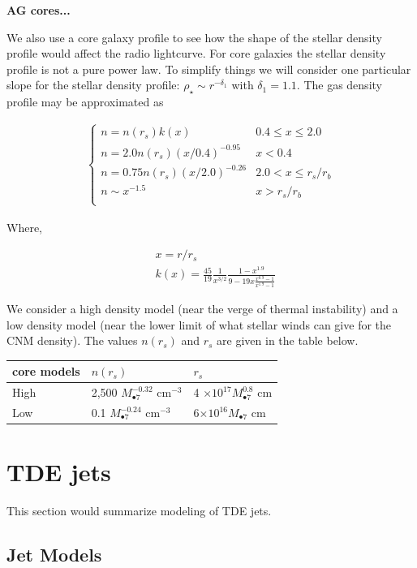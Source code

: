 \documentclass[usenatbib,fleqn]{mn2e}
\newcommand{\Mbh}[1][]{M_{\bullet#1}}
\begin{document}
{\bf AG cores...}

We also use a core galaxy profile to see how the shape of the stellar
density profile would affect the radio lightcurve. For core galaxies
the stellar density profile is not a pure power law. To simplify
things we will consider one particular slope for the stellar density
profile: $\rho_\star\sim r^{-\delta_1}$ with $\delta_1=1.1$. The gas
density profile may be approximated as

\begin{align}
\begin{cases}
n=n(r_s) k(x) & 0.4 \leq x\leq 2.0\\
n = 2.0 n(r_s) (x/0.4)^{-0.95} & x < 0.4\\
n = 0.75 n(r_s) (x/2.0)^{-0.26} & 2.0< x \leq r_s/r_b\\
n \sim x^{-1.5} & x>r_s/r_b\\
\end{cases}
\end{align}

Where, 

\begin{align}
  &x=r/r_s\\\nonumber
  &k(x)=\frac{45}{19} \frac{1}{x^{3/2}} \frac{1-x^{1.9}}{9-19
      x\frac{x^{0.9}-1}{x^{1.9}-1}}
\end{align}

We consider a high density model (near the verge of thermal
instability) and a low density model (near the lower limit of what
stellar winds can give for the CNM density). The values $n(r_s)$ and
$r_s$ are given in the table below. 

\begin{table}
\begin{tabular}{|l|l|l}
 core models & $n(r_s)$ & $r_s$\\
\hline
 High & 2,500 $\Mbh[7]^{-0.32}$ cm$^{-3}$ &  4 $\times 10^{17}  
 \Mbh[7]^{0.8}$ cm\\
 Low & 0.1 $\Mbh[7]^{-0.24}$ cm$^{-3}$ & 6$\times 10^{16} \Mbh[7]$ cm
\end{tabular}
\end{table}

\section{TDE jets}
\label{sec:jet}
This section would summarize modeling of TDE jets.

\subsection{Jet Models}
\end{document}
